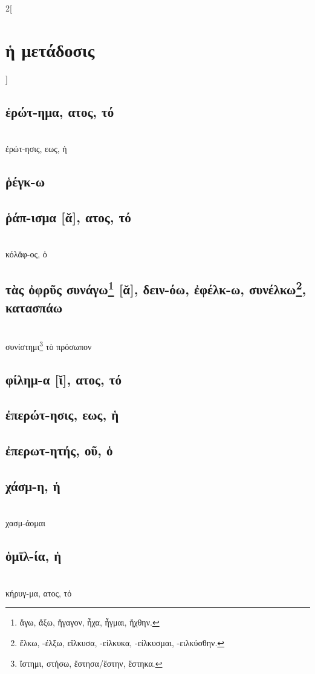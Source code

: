 \documentclass{book}
\begin{document}
\begin{multicols}{2}[\section{ἡ μετάδοσις}]
\subsection{ἐρώτ-ημα, ατος, τό}  ~\\
ἐρώτ-ησις, εως, ἡ
\subsection{ῥέγκ-ω}
\subsection{ῥάπ-ισμα [ᾰ], ατος, τό}  ~\\
κόλᾰφ-ος, ὁ 
\subsection{τὰς ὀφρῦς συνάγω\protect\footnote{ἄγω, ἄξω, ἤγαγον, ἦχα, ἦγμαι, ἤχθην.} [ᾰ], δειν-όω, ἐφέλκ-ω, συνέλκω\protect\footnote{ἕλκω, -έλξω, εἵλκυσα, -είλκυκα, -είλκυσμαι, -ειλκύσθην.}, κατασπάω} 
 ~\\
{συνίστημι\footnote{ἵστημι, στήσω, ἔστησα/ἔστην, ἕστηκα.} τὸ πρόσωπον}
\subsection{φίλημ-α [ῐ], ατος, τό}
\subsection{ἐπερώτ-ησις, εως, ἡ}
\subsection{ἐπερωτ-ητής, οῦ, ὁ}
\subsection{χάσμ-η, ἡ}  ~\\
χασμ-άομαι 
\subsection{ὁμῑλ-ία, ἡ}
 ~\\
κήρυγ-μα, ατος, τό
~
\end{multicols}
\end{document}
